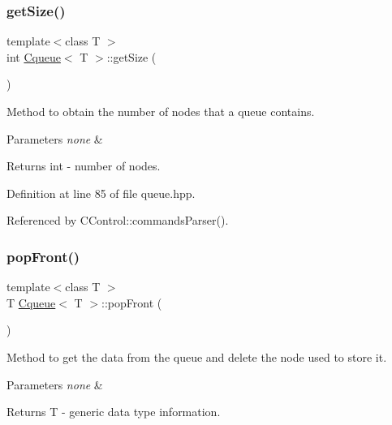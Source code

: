 \mbox{\label{class_cqueue_ad9baee6f6676b1eb0f0dfe450ba38eb1}} 
\subsubsection{\texorpdfstring{get\+Size()}{getSize()}}
{\footnotesize\ttfamily template$<$class T $>$ \\
int \mbox{\hyperlink{class_cqueue}{Cqueue}}$<$ T $>$\+::get\+Size (\begin{DoxyParamCaption}{ }\end{DoxyParamCaption})}



Method to obtain the number of nodes that a queue contains. 


\begin{DoxyParams}{Parameters}
{\em none} & \\
\hline
\end{DoxyParams}
\begin{DoxyReturn}{Returns}
int -\/ number of nodes. 
\end{DoxyReturn}


Definition at line 85 of file queue.\+hpp.



Referenced by C\+Control\+::commands\+Parser().

\mbox{\label{class_cqueue_a77d4728406bf0777254695f164132f3a}} 
\subsubsection{\texorpdfstring{pop\+Front()}{popFront()}}
{\footnotesize\ttfamily template$<$class T $>$ \\
T \mbox{\hyperlink{class_cqueue}{Cqueue}}$<$ T $>$\+::pop\+Front (\begin{DoxyParamCaption}{ }\end{DoxyParamCaption})}



Method to get the data from the queue and delete the node used to store it. 


\begin{DoxyParams}{Parameters}
{\em none} & \\
\hline
\end{DoxyParams}
\begin{DoxyReturn}{Returns}
T -\/ generic data type information. 
\end{DoxyReturn}



